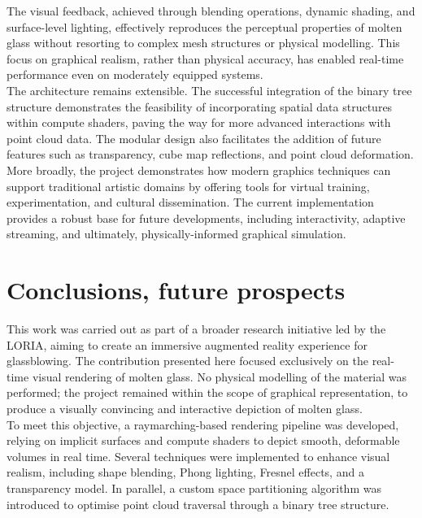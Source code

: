 \documentclass{rapportcs}
\begin{document}
        \noindent The visual feedback, achieved through blending operations, dynamic shading, and surface-level lighting, effectively reproduces the perceptual properties of molten glass without resorting to complex mesh structures or physical modelling. This focus on graphical realism, rather than physical accuracy, has enabled real-time performance even on moderately equipped systems.\\
        
        \noindent The architecture remains extensible. The successful integration of the binary tree structure demonstrates the feasibility of incorporating spatial data structures within compute shaders, paving the way for more advanced interactions with point cloud data. The modular design also facilitates the addition of future features such as transparency, cube map reflections, and point cloud deformation.\\
        
        \noindent More broadly, the project demonstrates how modern graphics techniques can support traditional artistic domains by offering tools for virtual training, experimentation, and cultural dissemination. The current implementation provides a robust base for future developments, including interactivity, adaptive streaming, and ultimately, physically-informed graphical simulation.
    
    \newpage

\section{Conclusions, future prospects}

This work was carried out as part of a broader research initiative led by the LORIA, aiming to create an immersive augmented reality experience for glassblowing. The contribution presented here focused exclusively on the real-time visual rendering of molten glass. No physical modelling of the material was performed; the project remained within the scope of graphical representation, to produce a visually convincing and interactive depiction of molten glass.\\

\noindent To meet this objective, a raymarching-based rendering pipeline was developed, relying on implicit surfaces and compute shaders to depict smooth, deformable volumes in real time. Several techniques were implemented to enhance visual realism, including shape blending, Phong lighting, Fresnel effects, and a transparency model. In parallel, a custom space partitioning algorithm was introduced to optimise point cloud traversal through a binary tree structure.\\
\end{document}
